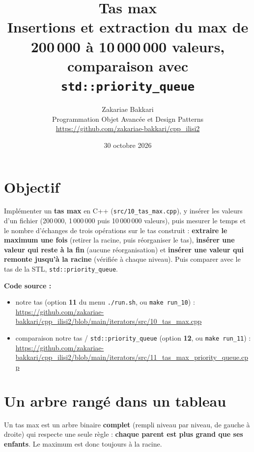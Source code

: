 \documentclass[11pt,a4paper]{article}
\title{\textbf{Tas max}\\[4pt]
       \large Insertions et extraction du max de 200\,000 à 10\,000\,000 valeurs, comparaison avec \texttt{std::priority\_queue}}
\author{Zakariae Bakkari\\
        \small Programmation Objet Avancée et Design Patterns\\
        \small\url{https://github.com/zakariae-bakkari/cpp_ilisi2}}
\date{30 octobre 2026}
\begin{document}
\maketitle

\section{Objectif}

Implémenter un \textbf{tas max} en C++ (\texttt{src/10\_tas\_max.cpp}), y insérer les
valeurs d'un fichier (200\,000, 1\,000\,000 puis 10\,000\,000 valeurs), puis mesurer le temps
et le nombre d'échanges de trois opérations sur le tas construit :
\textbf{extraire le maximum une fois} (retirer la racine, puis réorganiser le tas),
\textbf{insérer une valeur qui reste à la fin} (aucune réorganisation) et
\textbf{insérer une valeur qui remonte jusqu'à la racine} (vérifiée à chaque niveau).
Puis comparer avec le tas de la STL, \texttt{std::priority\_queue}.

\textbf{Code source :}
\begin{itemize}
  \item notre tas (option \textbf{11} du menu \texttt{./run.sh}, ou \texttt{make run\_10}) :\\
        \url{https://github.com/zakariae-bakkari/cpp_ilisi2/blob/main/iterators/src/10_tas_max.cpp}
  \item comparaison notre tas / \texttt{std::priority\_queue} (option \textbf{12}, ou \texttt{make run\_11}) :\\
        \url{https://github.com/zakariae-bakkari/cpp_ilisi2/blob/main/iterators/src/11_tas_max_priority_queue.cpp}
\end{itemize}

\section{Un arbre rangé dans un tableau}

Un tas max est un arbre binaire \textbf{complet} (rempli niveau par niveau, de gauche à
droite) qui respecte une seule règle : \textbf{chaque parent est plus grand que ses
enfants}. Le maximum est donc toujours à la racine.
\end{document}
